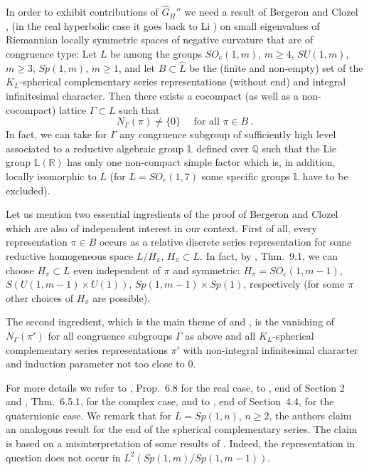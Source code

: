 \documentclass[10]{amsart}
\theoremstyle{remark}
\theoremstyle{definition}
\numberwithin{equation}{section}
\newcommand{\R}{\mathbb{R}}           %
\newcommand{\LL}{\mathbb{L}}
\newcommand{\Q}{{\mathbb{Q}}}           %
\begin{document}
{In order to exhibit contributions of $\widehat G_H''$ we need a result of  Bergeron and Clozel \cite{BeCl13},\cite{BeCl17} (in the real hyperbolic case
it goes back to Li \cite{Li93}) on small eigenvalues of  Riemannian locally symmetric spaces of negative curvature that are of congruence type: Let $L$ be among the groups $SO_e(1,m)$, 
$m\ge 4$, $SU(1,m)$, $m\ge 3$, $Sp(1,m)$, $m\ge 1$, and let $B\subset\widehat L$ be the (finite and non-empty) set of the $K_L$-spherical complementary series  representations (without end) and integral infinitesimal character.
Then there exists a cocompact (as well as a non-cocompact) lattice $\Gamma\subset L$ such that
$$  N_\Gamma(\pi) \ne \{0\}\quad\mbox{ for all } \pi\in B\ .$$
In fact, we can take for $\Gamma$ any congruence subgroup of sufficiently high level associated
to a reductive algebraic group $\LL$ defined over $\Q$ such that the Lie group $\LL(\R)$ has only one non-compact simple factor which is, in addition, locally isomorphic to $L$ (for $L=SO_e(1,7)$
some specific groups $\LL$ have to be excluded).

 Let us mention two essential ingredients of the proof of Bergeron and Clozel which are also
of independent interest in our context.
First of all, every representation $\pi\in B$ occurs as a relative discrete series representation for some 
reductive homogeneous
space $L/{H_\pi}$, $H_\pi\subset L$. In fact, by \cite{Sch87},  Thm.~9.1,  we can choose $H_\pi\subset L$ even independent of $\pi$ and symmetric: $H_\pi=SO_e(1,m-1)$, $S(U(1,m-1)\times U(1))$, $Sp(1,m-1)\times Sp(1)$, respectively (for some $\pi$ other choices of $H_\pi$ are possible).


The second ingredient, which is the main theme of \cite{BeCl13} and \cite{BeCl17}, is the vanishing of $N_\Gamma(\pi')$ for all congruence subgroups $\Gamma$ as above and all $K_L$-spherical complementary series representations $\pi'$ with non-integral infinitesimal character and induction parameter
not too close to $0$.

 For more details we refer to \cite{BeCl13}, Prop.~6.8 for the real case, to \cite{BeCl17}, end of Section 2 and \cite{BeCl05}, Thm.~6.5.1,
for the complex case, and to \cite{BeCl17}, end of Section~4.4, for the quaternionic case. We remark that for $L=Sp(1,n)$, $n\ge 2$, the authors claim an analogous result for the end
of the spherical complementary series. The claim is based on a misinterpretation of some results of \cite{Far79}. Indeed, the representation in question does not occur in $L^2(Sp(1,m)/Sp(1,m-1))$.

}
\end{document}
